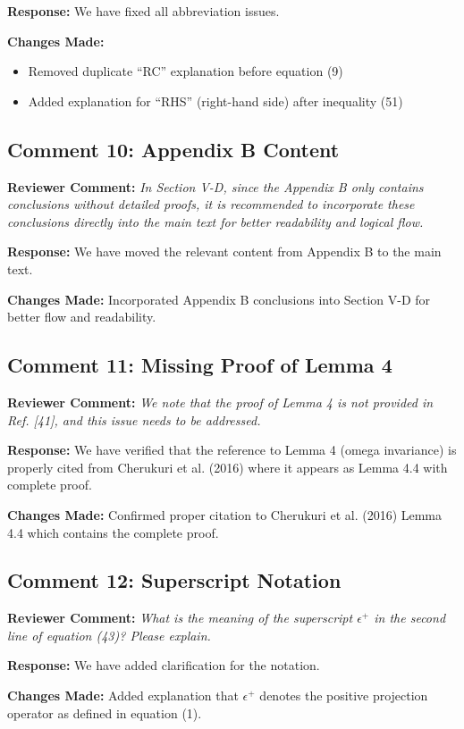 \documentclass[11pt]{article}
\newcommand{\reviewercomment}[1]{\textbf{Reviewer Comment:} \textit{#1}}
\newcommand{\response}[1]{\textbf{Response:} #1}
\newcommand{\changes}[1]{\textbf{Changes Made:} #1}
\begin{document}
\response{We have fixed all abbreviation issues.}

\changes{
\begin{itemize}
\item Removed duplicate ``RC'' explanation before equation (9)
\item Added explanation for ``RHS'' (right-hand side) after inequality (51)
\end{itemize}
}

\subsection*{Comment 10: Appendix B Content}

\reviewercomment{In Section V-D, since the Appendix B only contains conclusions without detailed proofs, it is recommended to incorporate these conclusions directly into the main text for better readability and logical flow.}

\response{We have moved the relevant content from Appendix B to the main text.}

\changes{Incorporated Appendix B conclusions into Section V-D for better flow and readability.}

\subsection*{Comment 11: Missing Proof of Lemma 4}

\reviewercomment{We note that the proof of Lemma 4 is not provided in Ref. [41], and this issue needs to be addressed.}

\response{We have verified that the reference to Lemma 4 (omega invariance) is properly cited from Cherukuri et al. (2016) where it appears as Lemma 4.4 with complete proof.}

\changes{Confirmed proper citation to Cherukuri et al. (2016) Lemma 4.4 which contains the complete proof.}

\subsection*{Comment 12: Superscript Notation}

\reviewercomment{What is the meaning of the superscript $\epsilon^+$ in the second line of equation (43)? Please explain.}

\response{We have added clarification for the notation.}

\changes{Added explanation that $\epsilon^+$ denotes the positive projection operator as defined in equation (1).}
\end{document}
